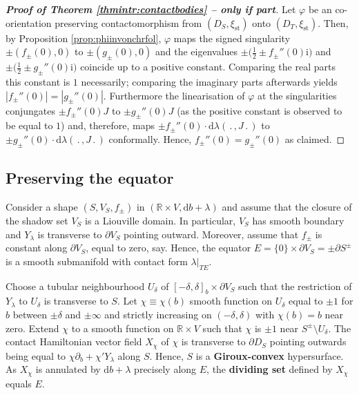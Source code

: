 \documentclass{amsart}
\theoremstyle{definition}
\newcommand{\rmd}{\mathrm d}
\newcommand{\rmi}{\mathrm i}
\newcommand{\R}{\mathbb R}
\DeclareMathOperator{\st}{\mathrm{st}}
\begin{document}
\begin{proof}[{\bf Proof of Theorem \ref{thmintr:contactbodies} -- only if part}]
Let $\varphi$ be an co-orientation preserving contactomorphism
from $(D_S,\xi_{\st})$ onto $(D_T,\xi_{\st})$.
Then, by Proposition \ref{prop:phiinvonchrfol},
$\varphi$ maps the signed singularity
$\pm(f_{\pm}(0),0)$ to $\pm(g_{\pm}(0),0)$ and
the eigenvalues $\pm\big(\frac12\pm f_{\pm}''(0)\rmi\big)$
and $\pm\big(\frac12\pm g_{\pm}''(0)\rmi\big)$
coincide up to a positive constant.
Comparing the real parts this constant is $1$ necessarily; 
comparing the imaginary parts afterwards yields
$|f_{\pm}''(0)|=|g_{\pm}''(0)|$.
Furthermore
the linearisation of $\varphi$ at the singularities
conjungates $\pm f_{\pm}''(0)J$ to $\pm g_{\pm}''(0)J$
(as the positive constant is observed to be equal to $1$)
and, therefore, maps
$\pm f_{\pm}''(0)\cdot\rmd\lambda(\,.\,,J\,.\,)$
to
$\pm g_{\pm}''(0)\cdot\rmd\lambda(\,.\,,J\,.\,)$
conformally.
Hence, 
$f_{\pm}''(0)=g_{\pm}''(0)$ as claimed.
\end{proof}




\subsection{Preserving the equator\label{subsec:equatorpreservation}}


Consider a shape $(S,V_S,f_{\pm})$
in $(\R\times V,\rmd b+\lambda)$
and assume that the closure of the shadow set $V_S$
is a Liouville domain.
In particular, $V_S$ has smooth boundary
and $Y_{\lambda}$ is transverse to $\partial V_S$ 
pointing outward.
Moreover,
assume that $f_{\pm}$ is constant along $\partial V_S$,
equal to zero, say.
Hence, the equator
$E=\{0\}\times\partial V_S=\pm\partial S^{\pm}$
is a smooth submanifold with contact form $\lambda|_{TE}$.

Choose a tubular neighbourhood $U_{\delta}$ of
$[-\delta,\delta]_b\times\partial V_S$
such that the restriction of $Y_{\lambda}$ to $U_{\delta}$
is transverse to $S$.
Let $\chi\equiv\chi(b)$ smooth function on $U_{\delta}$
equal to $\pm1$ for $b$ between $\pm\delta$ and $\pm\infty$
and strictly increasing on $(-\delta,\delta)$
with $\chi(b)=b$ near zero.
Extend $\chi$ to a smooth function on $\R\times V$
such that $\chi$ is $\pm1$ near $S^{\pm}\setminus U_{\delta}$.
The contact Hamiltonian vector field $X_{\chi}$ of $\chi$
is transverse to $\partial D_S$ pointing outwards
being equal to $\chi\partial_b+\chi'Y_{\lambda}$ along $S$.
Hence,
$S$ is a {\bf Giroux-convex} hypersurface.
As $X_{\chi}$ is annulated by $\rmd b+\lambda$
precisely along $E$,
the {\bf dividing set} defined by $X_{\chi}$ equals $E$.
\end{document}
